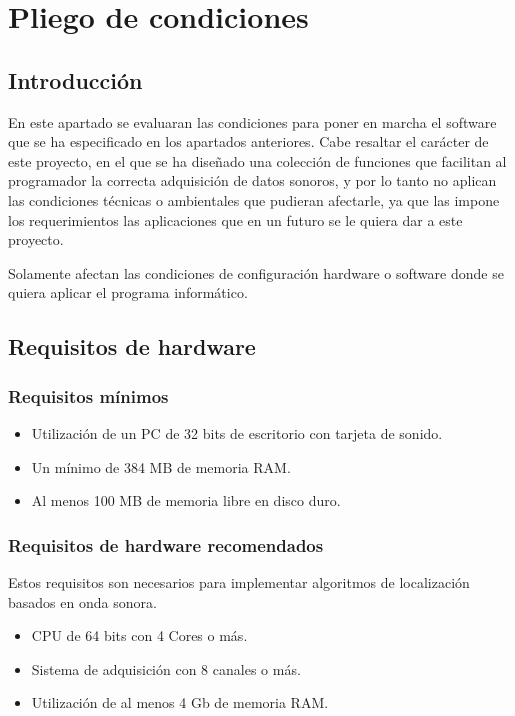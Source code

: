 %

\chapter{Pliego de condiciones}
\label{cha:pliego-de-condiciones}

\section{Introducción}

En este apartado se evaluaran las condiciones para poner en marcha el software que se ha especificado en los apartados anteriores. Cabe resaltar el carácter de este proyecto, en el que se ha diseñado una colección de funciones que facilitan al programador la correcta adquisición de datos sonoros, y por lo tanto no aplican las condiciones técnicas o ambientales que pudieran afectarle, ya que las impone los requerimientos las aplicaciones que en un futuro se le quiera dar a este proyecto.

Solamente afectan las condiciones de configuración hardware o software donde se quiera aplicar el programa informático.

\section{Requisitos de hardware}

\subsection{Requisitos mínimos}
\begin{itemize}
  \item Utilización de un PC de 32 bits de escritorio con tarjeta de sonido.
  \item Un mínimo de 384 MB de memoria RAM.
  \item Al menos 100 MB de memoria libre en disco duro.
\end{itemize}

\subsection{Requisitos de hardware recomendados}
Estos requisitos son necesarios para implementar algoritmos de localización basados en onda sonora.
\begin{itemize}
  \item CPU de 64 bits con 4 Cores o más.
  \item Sistema de adquisición con 8 canales o más.
  \item Utilización de al menos 4 Gb de memoria RAM.
\end{itemize}

